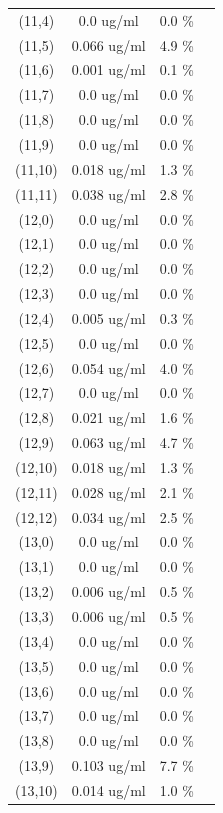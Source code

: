\documentclass{article}
\begin{document}
\begin{tabular}{c c c c}
(11,4)&        0.0 ug/ml        &0.0 \%\\
(11,5)&        0.066 ug/ml        &4.9 \%\\
(11,6)&        0.001 ug/ml        &0.1 \%\\
(11,7)&        0.0 ug/ml        &0.0 \%\\
(11,8)&        0.0 ug/ml        &0.0 \%\\
(11,9)&        0.0 ug/ml        &0.0 \%\\
(11,10)&        0.018 ug/ml        &1.3 \%\\
(11,11)&        0.038 ug/ml        &2.8 \%\\
(12,0)&        0.0 ug/ml        &0.0 \%\\
(12,1)&        0.0 ug/ml        &0.0 \%\\
(12,2)&        0.0 ug/ml        &0.0 \%\\
(12,3)&        0.0 ug/ml        &0.0 \%\\
(12,4)&        0.005 ug/ml        &0.3 \%\\
(12,5)&        0.0 ug/ml        &0.0 \%\\
(12,6)&        0.054 ug/ml        &4.0 \%\\
(12,7)&        0.0 ug/ml        &0.0 \%\\
(12,8)&        0.021 ug/ml        &1.6 \%\\
(12,9)&        0.063 ug/ml        &4.7 \%\\
(12,10)&        0.018 ug/ml        &1.3 \%\\
(12,11)&        0.028 ug/ml        &2.1 \%\\
(12,12)&        0.034 ug/ml        &2.5 \%\\
(13,0)&        0.0 ug/ml        &0.0 \%\\
(13,1)&        0.0 ug/ml        &0.0 \%\\
(13,2)&        0.006 ug/ml        &0.5 \%\\
(13,3)&        0.006 ug/ml        &0.5 \%\\
(13,4)&        0.0 ug/ml        &0.0 \%\\
(13,5)&        0.0 ug/ml        &0.0 \%\\
(13,6)&        0.0 ug/ml        &0.0 \%\\
(13,7)&        0.0 ug/ml        &0.0 \%\\
(13,8)&        0.0 ug/ml        &0.0 \%\\
(13,9)&        0.103 ug/ml        &7.7 \%\\
(13,10)&        0.014 ug/ml        &1.0 \%\\

\end{tabular}
\end{document}
